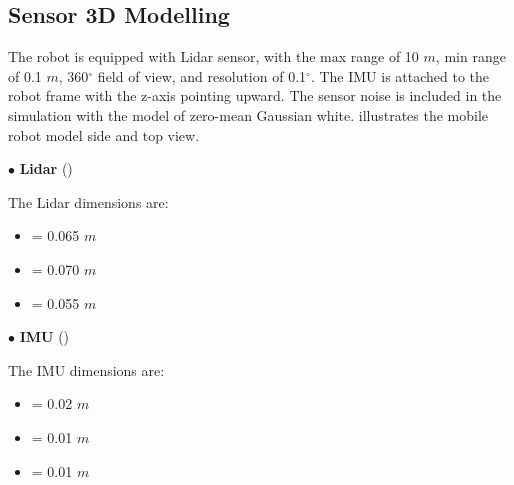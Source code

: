\subsection{Sensor 3D Modelling}
\hspace{1.27cm}
The robot is equipped with Lidar sensor, with the max range of 10 $m$, min range of 0.1 $m$, 360$^{\circ}$ field of view, and resolution of 0.1$^{\circ}$. The IMU is attached to the robot frame with the z-axis pointing upward. The sensor noise is included in the simulation with the model of zero-mean Gaussian white. \textbf{\figureautorefname{ \ref{fig:Mobile Robot Modelling Side and Top View}}} illustrates the mobile robot model side and top view.\par

$\bullet$ \textbf{Lidar} (\textbf{\figureautorefname{ \ref{fig:Lidar Dimension}}})\par
The Lidar dimensions are:
\begin{itemize}
	\item { = 0.065 $m$}
	\item { = 0.070 $m$}
	\item { = 0.055 $m$}
\end{itemize}

$\bullet$ \textbf{IMU} (\textbf{\figureautorefname{ \ref{fig:IMU Dimension}}})\par
The IMU dimensions are:
\begin{itemize}
	\item { = 0.02 $m$}
	\item { = 0.01 $m$}
	\item { = 0.01 $m$}
\end{itemize}

